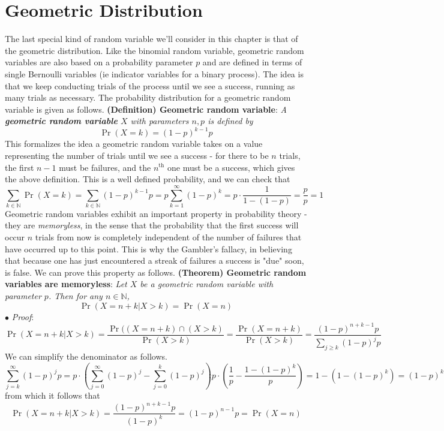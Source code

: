\documentclass{article}
\newcommand*{\tb}{\textbf}
\newcommand*{\ti}{\textit}
\newcommand*{\nn}{\newline \newline}
\newcommand*{\Pf}{\indent \ensuremath{\bullet} \textit{Proof}: }
\newcommand*{\N}{\mathbb{N}}
\begin{document}
\section{Geometric Distribution}
The last special kind of random variable we'll consider in this chapter is that of the geometric distribution. Like the binomial random variable, geometric random variables are also based on a probability parameter $ p $ and are defined in terms of single Bernoulli variables (ie indicator variables for a binary process). The idea is that we keep conducting trials of the process until we see a success, running as many trials as necessary. The probability distribution for a geometric random variable is given as follows.
\nn
\tb{(Definition) Geometric random variable}: \ti{A \tb{geometric random variable} $ X $ with parameters $ n, p $ is defined by}
$$ \Pr(X = k) = (1 - p)^{k - 1} p $$
This formalizes the idea a geometric random variable takes on a value representing the number of trials until we see a success - for there to be $ n $ trials, the first $ n - 1 $ must be failures, and the $ n^{\text{th}} $ one must be a success, which gives the above definition. This is a well defined probability, and we can check that
$$ \sum_{k \in \N} \Pr(X = k) = \sum_{k \in \N} (1 - p)^{k - 1} p = p \sum_{k = 1}^\infty (1 - p)^k = p \cdot \frac{1}{1 - (1 - p)} = \frac{p}{p} = 1 $$
Geometric random variables exhibit an important property in probability theory - they are \ti{memoryless}, in the sense that the probability that the first success will occur $ n $ trials from now is completely independent of the number of failures that have occurred up to this point. This is why the Gambler's fallacy, in believing that because one has just encountered a streak of failures a success is "due" soon, is false. We can prove this property as follows.
\nn
\tb{(Theorem) Geometric random variables are memoryless}: \ti{Let $ X $ be a geometric random variable with parameter $ p $. Then for any $ n \in \N $,}
$$ \Pr(X = n + k | X > k) = \Pr(X = n) $$
\Pf $$ \Pr(X = n + k | X > k) = \frac{\Pr((X = n + k) \cap (X > k)}{\Pr(X > k)} = \frac{\Pr(X = n + k)}{\Pr(X > k)} = \frac{(1 - p)^{n + k - 1} p}{\sum_{j \geq k} (1 - p)^j p} $$
We can simplify the denominator as follows.
$$ \sum_{j = k}^\infty (1 - p)^j p = p \cdot \left( \sum_{j = 0}^\infty (1 - p)^j - \sum_{j = 0}^k (1 - p)^j \right) p \cdot \left( \frac{1}{p} - \frac{1 - (1 - p)^k}{p} \right) = 1 - (1 - (1 - p)^k) = (1 - p)^k $$
from which it follows that
$$ \Pr(X = n + k | X > k) = \frac{(1 - p)^{n + k - 1} p}{(1 - p)^k} = (1 - p)^{n - 1} p = \Pr(X = n) $$
\end{document}
